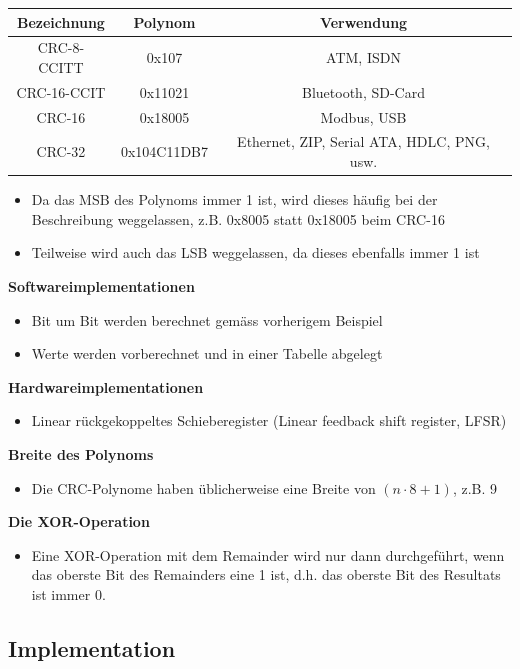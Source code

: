 \begin{tabular}{|c|c|c|}
\hline \textbf{Bezeichnung} & \textbf{Polynom} & \textbf{Verwendung} \\ 
\hline CRC-8-CCITT & 0x107 &  ATM, ISDN\\ 
\hline CRC-16-CCIT & 0x11021 & Bluetooth, SD-Card \\ 
\hline  CRC-16 & 0x18005  &  Modbus, USB\\
\hline  CRC-32 & 0x104C11DB7 & Ethernet, ZIP, Serial ATA, HDLC, PNG, usw. \\
\hline 
\end{tabular} 

\begin{itemize}
	\item Da das MSB des Polynoms immer 1 ist, wird dieses häufig bei der Beschreibung weggelassen, z.B. 0x8005 statt 0x18005 beim CRC-16
	\item Teilweise wird auch das LSB weggelassen, da dieses ebenfalls immer 1 ist	
\end{itemize}

\textbf{Softwareimplementationen}
\begin{itemize}
	\item Bit um Bit werden berechnet gemäss vorherigem Beispiel
	\item Werte werden vorberechnet und in einer Tabelle abgelegt	
\end{itemize}

\textbf{Hardwareimplementationen}
\begin{itemize}
	\item Linear rückgekoppeltes Schieberegister (Linear feedback shift register, LFSR)	
\end{itemize}

\textbf{Breite des Polynoms}
\begin{itemize}
	\item Die CRC-Polynome haben üblicherweise eine Breite von $(n \cdot 8 + 1)$, z.B. 9		
\end{itemize}

\textbf{Die XOR-Operation}
\begin{itemize}
	\item Eine XOR-Operation mit dem Remainder wird nur dann durchgeführt, wenn
	das oberste Bit des Remainders eine 1 ist, d.h. das oberste Bit des Resultats ist
	immer 0.
\end{itemize}
\newpage
\subsection{Implementation}

